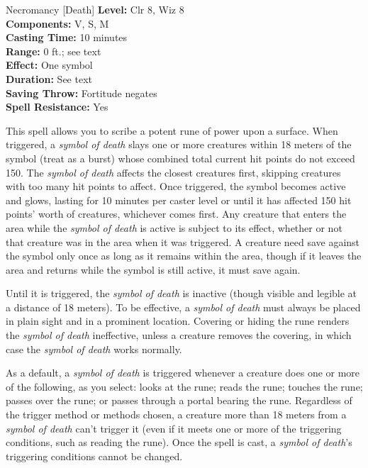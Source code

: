 {Necromancy [Death]}
{
	\textbf{Level:}
	Clr 8, Wiz 8\\
	\textbf{Components:}
	V, S, M\\
	\textbf{Casting Time:}
	10 minutes\\
	\textbf{Range:}
	0 ft.; see text\\
	\textbf{Effect:}
	One symbol\\
	\textbf{Duration:}
	See text\\
	\textbf{Saving Throw:}
	Fortitude negates\\
	\textbf{Spell Resistance:}
	Yes\\
}
{
	This spell allows you to scribe a potent rune of power upon a surface. When triggered, a \emph{symbol of death} slays one or more creatures within 18 meters of the symbol (treat as a burst) whose combined total current hit points do not exceed 150. The \emph{symbol of death} affects the closest creatures first, skipping creatures with too many hit points to affect. Once triggered, the symbol becomes active and glows, lasting for 10 minutes per caster level or until it has affected 150 hit points' worth of creatures, whichever comes first. Any creature that enters the area while the \emph{symbol of death} is active is subject to its effect, whether or not that creature was in the area when it was triggered. A creature need save against the symbol only once as long as it remains within the area, though if it leaves the area and returns while the symbol is still active, it must save again.

	Until it is triggered, the \emph{symbol of death} is inactive (though visible and legible at a distance of 18 meters). To be effective, a \emph{symbol of death} must always be placed in plain sight and in a prominent location. Covering or hiding the rune renders the \emph{symbol of death} ineffective, unless a creature removes the covering, in which case the \emph{symbol of death} works normally.

	As a default, a \emph{symbol of death} is triggered whenever a creature does one or more of the following, as you select: looks at the rune; reads the rune; touches the rune; passes over the rune; or passes through a portal bearing the rune. Regardless of the trigger method or methods chosen, a creature more than 18 meters from a \emph{symbol of death} can't trigger it (even if it meets one or more of the triggering conditions, such as reading the rune). Once the spell is cast, a \emph{symbol of death}'s triggering conditions cannot be changed.

}
